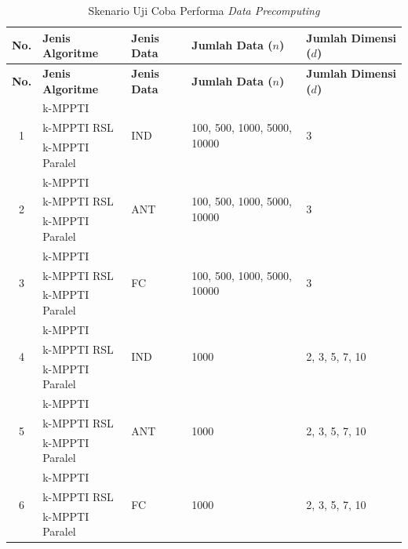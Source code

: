 \begin{longtable}{| c | p{3cm} | p{1cm} | p{2.5cm} | p{1.5cm} |}
	\caption{Skenario Uji Coba Performa \textit{Data Precomputing} \label{tab:uji-coba-performa-precompute}}\\
	\hline
	\textbf{No.} & \textbf{Jenis Algoritme} & \textbf{Jenis Data} & \textbf{Jumlah Data ($n$)} & \textbf{Jumlah Dimensi ($d$)} \\ \hline
	\endfirsthead
	\hline
	\textbf{No.} & \textbf{Jenis Algoritme} & \textbf{Jenis Data} & \textbf{Jumlah Data ($n$)} & \textbf{Jumlah Dimensi ($d$)} \\ \hline
	\endhead
	\multirow{3}{*}{1} & k-MPPTI & \multirow{3}{1cm}{IND} & \multirow{3}{2.5cm}{100, 500, 1000, 5000, 10000} & \multirow{3}{1.5cm}{3} \\ \cline{2-2} \nopagebreak
	& k-MPPTI RSL & & & \\ \cline{2-2} \nopagebreak
	& k-MPPTI Paralel & & & \\ \hline
	\multirow{3}{*}{2} & k-MPPTI & \multirow{3}{1cm}{ANT} & \multirow{3}{2.5cm}{100, 500, 1000, 5000, 10000} & \multirow{3}{1.5cm}{3}\\ \cline{2-2} \nopagebreak
	& k-MPPTI RSL & & & \\ \cline{2-2} \nopagebreak
	& k-MPPTI Paralel & & & \\ \hline
	\multirow{3}{*}{3} & k-MPPTI & \multirow{3}{1cm}{FC} & \multirow{3}{2.5cm}{100, 500, 1000, 5000, 10000} & \multirow{3}{1.5cm}{3}\\ \cline{2-2} \nopagebreak
	& k-MPPTI RSL & & & \\ \cline{2-2} \nopagebreak
	& k-MPPTI Paralel & & & \\ \hline 
	\multirow{3}{*}{4} & k-MPPTI & \multirow{3}{1cm}{IND} & \multirow{3}{2.5cm}{1000} & \multirow{3}{1.5cm}{2, 3, 5, 7, 10}\\ \cline{2-2}	\nopagebreak	
	& k-MPPTI RSL & & & \\ \cline{2-2} \nopagebreak
	& k-MPPTI Paralel & & & \\ \hline
	\multirow{3}{*}{5} & k-MPPTI & \multirow{3}{1cm}{ANT} & \multirow{3}{2.5cm}{1000} & \multirow{3}{1.5cm}{2, 3, 5, 7, 10}\\ \cline{2-2}\nopagebreak
	& k-MPPTI RSL & & & \\ \cline{2-2} \nopagebreak
	& k-MPPTI Paralel & & & \\ \hline
	\multirow{3}{*}{6} & k-MPPTI & \multirow{3}{1cm}{FC} & \multirow{3}{2.5cm}{1000} & \multirow{3}{1.5cm}{2, 3, 5, 7, 10}\\ \cline{2-2} \nopagebreak
	& k-MPPTI RSL & & & \\ \cline{2-2} \nopagebreak
	& k-MPPTI Paralel & & & \\ \hline
\end{longtable}

